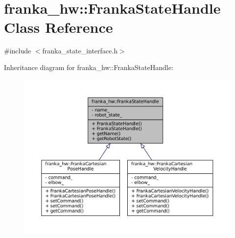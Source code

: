 \hypertarget{classfranka__hw_1_1FrankaStateHandle}{}\section{franka\+\_\+hw\+:\+:Franka\+State\+Handle Class Reference}
\label{classfranka__hw_1_1FrankaStateHandle}


{\ttfamily \#include $<$franka\+\_\+state\+\_\+interface.\+h$>$}



Inheritance diagram for franka\+\_\+hw\+:\+:Franka\+State\+Handle\+:
\nopagebreak
\begin{figure}[H]
\begin{center}
\leavevmode
\includegraphics[width=350pt]{classfranka__hw_1_1FrankaStateHandle__inherit__graph}
\end{center}
\end{figure}


